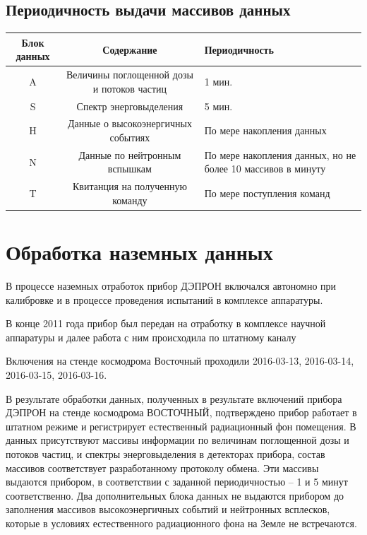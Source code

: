 \subsection{Периодичность выдачи массивов данных}
\begin{center}
	{\small 
		\begin{tabularx}{\textwidth}{|c|c|X|}
			\hline
			Блок данных & Содержание                                 & Периодичность \\ \hline
			     A      & Величины поглощенной дозы и потоков частиц & 1 мин. \\ \hline
			     S      & Спектр энерговыделения                     & 5 мин. \\ \hline
			     H      & Данные о высокоэнергичных событиях       & По мере накопления данных \\ \hline
			     N      & Данные по нейтронным вспышкам              &  По мере накопления данных, но не более 10 массивов в минуту\\ \hline
			     T      & Квитанция на полученную команду            &  По мере поступления команд\\ \hline
		\end{tabularx}
}
\end{center}



\section{Обработка наземных данных}\label{sec3.2.1}
В процессе наземных отработок прибор ДЭПРОН включался автономно при калибровке и в процессе проведения испытаний в комплексе аппаратуры.


В конце 2011 года прибор был передан на отработку в комплексе научной аппаратуры и далее работа с ним происходила по штатному каналу

Включения на стенде космодрома Восточный проходили  
2016-03-13,
2016-03-14,
2016-03-15,
2016-03-16.


В результате обработки данных, полученных в результате включений прибора ДЭПРОН на стенде космодрома ВОСТОЧНЫЙ, подтверждено прибор работает в штатном режиме и регистрирует естественный радиационный фон помещения.
В данных присутствуют массивы информации по величинам поглощенной дозы и потоков частиц, и спектры энерговыделения в детекторах прибора, состав массивов соответствует разработанному протоколу обмена. Эти массивы выдаются прибором, в соответствии с заданной периодичностью – 1 и 5 минут соответственно. Два дополнительных блока данных не выдаются прибором до заполнения массивов высокоэнергичных событий и нейтронных всплесков, которые в условиях естественного радиационного фона на Земле не встречаются.

